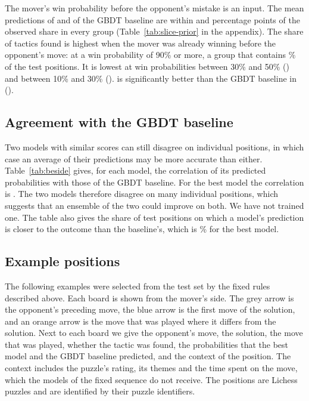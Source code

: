 \documentclass[11pt]{article}
\begin{document}
The mover's win probability before the opponent's mistake is an input. The
mean predictions of  and of the GBDT baseline are within
 and
 percentage points of the observed share
in every group (Table~\ref{tab:slice-prior} in the appendix). The share of tactics found is
highest when the mover was already winning before the opponent's move:
 at a win probability of 90\% or more, a group
that contains \% of the test positions. It is lowest
at win probabilities between 30\% and 50\% ()
and between 10\% and 30\% ().
 is significantly better than the GBDT baseline in
 ().

\subsection{Agreement with the GBDT baseline}

Two models with similar scores can still disagree on individual positions, in
which case an average of their predictions may be more accurate than either.
Table~\ref{tab:beside} gives, for each model, the correlation of its
predicted probabilities with those of the GBDT baseline. For the best model
the correlation is . The two models therefore
disagree on many individual positions, which suggests that an ensemble of the
two could improve on both. We have not trained one. The table also gives the
share of test positions on which a model's prediction is closer to the
outcome than the baseline's, which is \% for the best
model.

\begin{table}[htbp]\centering\small
{}
\caption{Agreement with the GBDT baseline on the test set: the correlation
between the two models' predicted probabilities, and the share of positions
on which the model's prediction is closer to the outcome than the
baseline's.}
\label{tab:beside}
\end{table}

\subsection{Example positions}
\label{sec:positions}

The following examples were selected from the test set by the fixed rules
described above. Each board is shown from the mover's side. The grey arrow is
the opponent's preceding move, the blue arrow is the first move of the
solution, and an orange arrow is the move that was played where it differs
from the solution.
Next to each board we give the opponent's move, the solution, the move that
was played, whether the tactic was found, the probabilities that the best
model and the GBDT baseline predicted, and the context of the position. The
context includes the puzzle's rating, its themes and the time spent on the
move, which the models of the fixed sequence do not receive. The positions
are Lichess puzzles and are identified by their puzzle identifiers.
\end{document}
